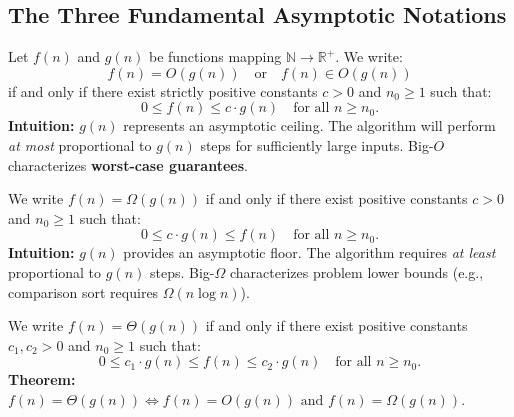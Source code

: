 \documentclass[11pt,a4paper]{article}
\begin{document}
\subsection{The Three Fundamental Asymptotic Notations}

\begin{definitionbox}
Let $f(n)$ and $g(n)$ be functions mapping $\mathbb{N} \to \mathbb{R}^+$. We write:
\[
f(n) = O(g(n)) \quad \text{or} \quad f(n) \in O(g(n))
\]
if and only if there exist strictly positive constants $c > 0$ and $n_0 \ge 1$ such that:
\[
0 \le f(n) \le c \cdot g(n) \quad \text{for all } n \ge n_0.
\]
\textbf{Intuition:} $g(n)$ represents an asymptotic ceiling. The algorithm will perform \emph{at most} proportional to $g(n)$ steps for sufficiently large inputs. Big-$O$ characterizes \textbf{worst-case guarantees}.
\end{definitionbox}

\begin{definitionbox}
We write $f(n) = \Omega(g(n))$ if and only if there exist positive constants $c > 0$ and $n_0 \ge 1$ such that:
\[
0 \le c \cdot g(n) \le f(n) \quad \text{for all } n \ge n_0.
\]
\textbf{Intuition:} $g(n)$ provides an asymptotic floor. The algorithm requires \emph{at least} proportional to $g(n)$ steps. Big-$\Omega$ characterizes problem lower bounds (e.g., comparison sort requires $\Omega(n \log n)$).
\end{definitionbox}

\begin{definitionbox}
We write $f(n) = \Theta(g(n))$ if and only if there exist positive constants $c_1, c_2 > 0$ and $n_0 \ge 1$ such that:
\[
0 \le c_1 \cdot g(n) \le f(n) \le c_2 \cdot g(n) \quad \text{for all } n \ge n_0.
\]
\textbf{Theorem:} $f(n) = \Theta(g(n)) \iff f(n) = O(g(n)) \text{ and } f(n) = \Omega(g(n))$.
\end{definitionbox}
\end{document}
